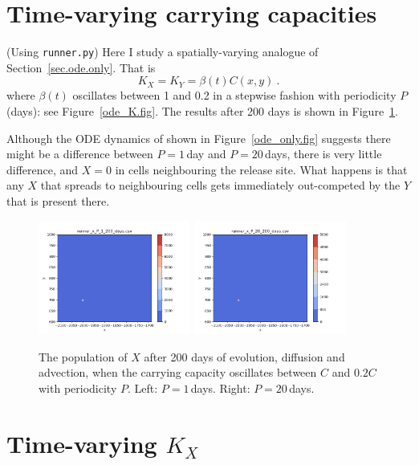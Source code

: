 \documentclass{article}
\begin{document}
\section{Time-varying carrying capacities}

(Using {\tt runner.py})  Here I study a spatially-varying analogue of Section~\ref{sec.ode.only}.  That is
\begin{equation}
  K_{X} = K_{Y} = \beta(t) C(x, y) \ .
\end{equation}
where $\beta(t)$ oscillates between 1 and 0.2 in a stepwise fashion with periodicity $P$ (days): see Figure~\ref{ode_K.fig}.  The results after 200 days is shown in Figure~\ref{runner_x_P_1_200_days.fig}.

Although the ODE dynamics of shown in Figure~\ref{ode_only.fig} suggests there might be a difference between $P=1$\,day and $P=20$\,days, there is very little difference, and $X=0$ in cells neighbouring the release site.  What happens is that any $X$ that spreads to neighbouring cells gets immediately out-competed by the $Y$ that is present there.

\begin{figure}[htb]
  \centering
  \includegraphics[width=5cm]{runner_x_P_1_200_days.png} \quad
  \includegraphics[width=5cm]{runner_x_P_20_200_days.png}
  \caption{\label{runner_x_P_1_200_days.fig}The population of $X$ after 200 days of evolution, diffusion and advection, when the carrying capacity oscillates between $C$ and $0.2C$ with periodicity $P$.  Left: $P=1$\,days.  Right: $P=20$\,days.}
\end{figure}


\section{Time-varying $K_{X}$}
\end{document}
